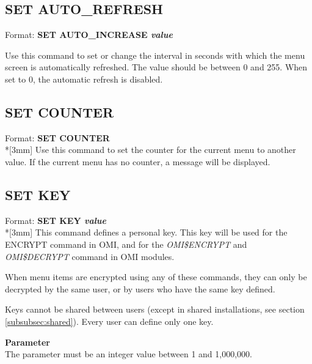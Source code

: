 \documentclass[a4paper]{book}
\newcommand{\vs}{\vspace{3mm}}
\renewcommand{\indent}{\hspace*{5mm}}
\begin{document}
\subsection{SET AUTO{\_}REFRESH}
\label{subsubsec:mylabel74}

\indent Format: \textbf{SET AUTO{\_}INCREASE \textit{value}}

\noindent Use this command to set or change the interval in seconds with which the 
menu screen is automatically refreshed. The value should be between 0 and 
255. When set to 0, the automatic refresh is disabled.

\subsection{SET COUNTER}
\label{subsubsec:mylabel75}

\indent Format: \textbf{SET COUNTER}\\*[3mm]
Use this command to set the counter for the current menu to another value. 
If the current menu has no counter, a message will be displayed.

\subsection{SET KEY}
\label{subsubsec:mylabel76}

\indent Format: \textbf{SET KEY \textit{value}}\\*[3mm]
This command defines a personal key. This key will be used for the 
\textsf{ENCRYPT} command in OMI, and for the 
\textsl{OMI{\$}ENCRYPT} and 
\textsl{OMI{\$}DECRYPT} command in OMI 
modules.

\vs

When menu items are encrypted using any of these commands, they can only be 
decrypted by the same user, or by users who have the same key defined.

Keys cannot be shared between users (except in shared installations, see 
section \ref{subsubsec:shared}). Every user can define only one key.

\noindent\textbf{Parameter}\\[3mm]
The parameter must be an integer value between 1 and 1,000,000.
\end{document}
